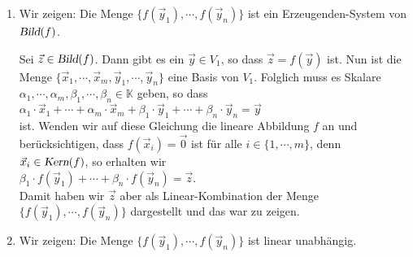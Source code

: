 \begin{enumerate}
\item Wir zeigen:
      Die Menge $\bigl\{ f(\vec{y}_1), \cdots, f(\vec{y}_n) \bigl\}$ ist ein Erzeugenden-System von $\textsl{Bild}(f)$.

      Sei $\vec{z} \in \textsl{Bild}(f)$.  Dann gibt es ein $\vec{y} \in V_1$, so dass $\vec{z} = f(\vec{y})$ ist.
      Nun ist die Menge $\{ \vec{x}_1, \cdots, \vec{x}_m,  \vec{y}_1, \cdots, \vec{y}_n \}$ eine Basis von $V_1$. 
      Folglich muss es Skalare $\alpha_1, \cdots, \alpha_m, \beta_1, \cdots, \beta_n \in \mathbb{K}$ geben, so dass 
      \\[0.2cm]
      \hspace*{1.3cm}
      $\alpha_1 \cdot \vec{x}_1 + \cdots + \alpha_m \cdot \vec{x}_m + \beta_1 \cdot \vec{y}_1 + \cdots + \beta_n \cdot \vec{y}_n = \vec{y}$
      \\[0.2cm]
      ist.  Wenden wir auf diese Gleichung die lineare Abbildung $f$ an und ber\"{u}cksichtigen, dass
      $f(\vec{x}_i) = \vec{0}$ ist f\"{u}r alle $i \in \{1,\cdots,m\}$, denn $\vec{x}_i \in \textsl{Kern}(f)$, so erhalten wir
      \\[0.2cm]
      \hspace*{1.3cm}
      $\beta_1 \cdot f(\vec{y}_1) + \cdots + \beta_n \cdot f(\vec{y}_n) = \vec{z}$.
      \\[0.2cm]
      Damit haben wir $\vec{z}$ aber als Linear-Kombination der Menge  $\{ f(\vec{y}_1), \cdots, f(\vec{y}_n) \}$ 
      dargestellt und das war zu zeigen.
\item Wir zeigen: Die Menge $\bigl\{ f(\vec{y}_1), \cdots, f(\vec{y}_n) \bigr\}$ ist linear unabh\"{a}ngig.
  

\end{enumerate}
